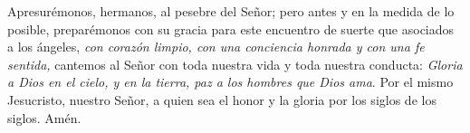 \begin{body}
	Apresurémonos, hermanos, al pesebre del Señor; pero antes y en la medida de lo posible, preparémonos con su gracia para este encuentro de suerte que asociados a los ángeles, \emph{con corazón limpio, con una conciencia honrada y con una fe sentida,} cantemos al Señor con toda nuestra vida y toda nuestra conducta: \emph{Gloria a Dios en el cielo, y en la tierra, paz a los hombres que Dios ama}. Por el mismo Jesucristo, nuestro Señor, a quien sea el honor y la gloria por los siglos de los siglos. Amén.
\end{body}